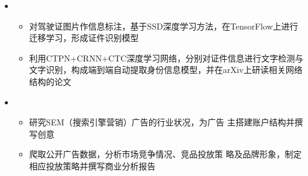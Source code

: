   \begin{itemize}[leftmargin=*]
    \item
     	{\small
			\begin{itemize}
				\item	对驾驶证图片作信息标注，基于SSD深度学习方法，在TensorFlow上进行迁移学习，形成证件识别模型
				\item	利用CTPN+CRNN+CTC深度学习网络，分别对证件信息进行文字检测与文字识别，构成端到端自动提取身份信息模型，并在arXiv上研读相关网络结构的论文
			\end{itemize}			     	
     	}
    \item
      {\small
      	\begin{itemize}
        		\item 研究SEM（搜索引擎营销）广告的行业状况，为广告					主搭建账户结构并撰写创意
			\item 爬取公开广告数据，分析市场竞争情况、竞品投放策					略及品牌形象，制定相应投放策略并撰写商业分析报告
      \end{itemize}
      }

  \end{itemize}
